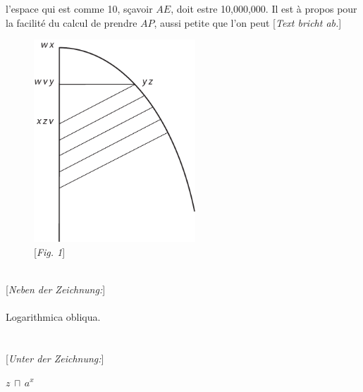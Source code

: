 \pend
\newpage
\pstart \noindent
l'espace qui est comme 10, s\c{c}avoir $\displaystyle AE$, doit estre
10,000,000. Il est \`{a} propos pour la facilit\'{e} du calcul de prendre $\displaystyle AP$, aussi petite que l'on peut
 [\textit{Text bricht ab.}]
\pend
\pstart
\vspace{3mm}
\\
    \begin{figure} 
    \includegraphics[trim = 0mm -6mm -45mm 0mm, clip, width=0.54\textwidth]{images/lh0350911_012v_1-d1.pdf}
    \\
    \centering
  \hspace*{-10mm}
    [\textit{Fig. 1}] %
    \end{figure}
\\[1pt]
[\textit{Neben der Zeichnung:}] 
\\ \\
Logarithmica obliqua.\\ \\ \\[1pt]
[\textit{Unter der Zeichnung:}] \\ 
\rule[-4mm]{0mm}{10mm} $\displaystyle z \, \sqcap \, a^x$\\ 
